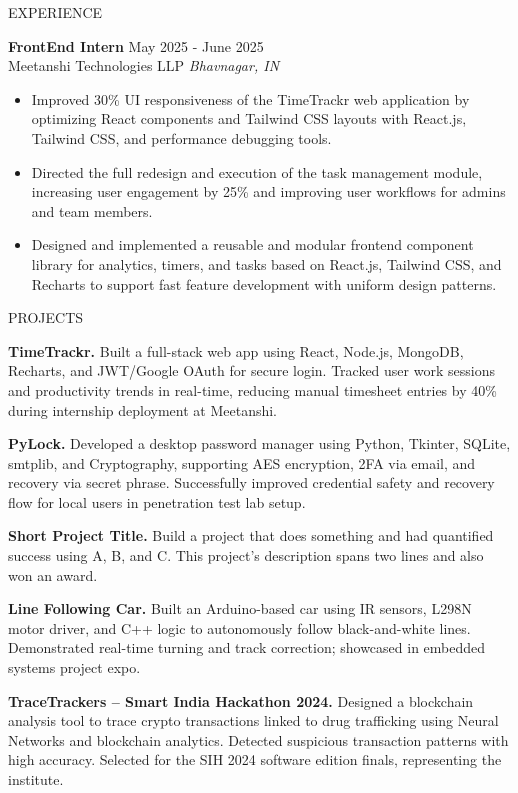 \documentclass{resume} %
\begin{document}
\begin{rSection}{EXPERIENCE}

\textbf{FrontEnd Intern} \hfill May 2025 - June 2025\\
Meetanshi Technologies LLP \hfill \textit{Bhavnagar, IN}
 \begin{itemize}
    \itemsep -3pt {} 
     \item Improved 30\% UI responsiveness of the TimeTrackr web application by optimizing React components and Tailwind CSS layouts with React.js, Tailwind CSS, and performance debugging tools.
     \item Directed the full redesign and execution of the task management module, increasing user engagement by 25\% and improving user workflows for admins and team members.
    \item Designed and implemented a reusable and modular frontend component library for analytics, timers, and tasks based on React.js, Tailwind CSS, and Recharts to support fast feature development with uniform design patterns. 
 \end{itemize}

\end{rSection} 


\begin{rSection}{PROJECTS}
\vspace{-1.25em}
\item \textbf{TimeTrackr.} {Built a full-stack web app using React, Node.js, MongoDB, Recharts, and JWT/Google OAuth for secure login. Tracked user work sessions and productivity trends in real-time, reducing manual timesheet entries by 40\% during internship deployment at Meetanshi.}
\item \textbf{PyLock.} {Developed a desktop password manager using Python, Tkinter, SQLite, smtplib, and Cryptography, supporting AES encryption, 2FA via email, and recovery via secret phrase. Successfully improved credential safety and recovery flow for local users in penetration test lab setup.}
\item \textbf{Short Project Title.} {Build a project that does something and had quantified success using A, B, and C. This project's description spans two lines and also won an award.}
\item \textbf{Line Following Car.} {Built an Arduino-based car using IR sensors, L298N motor driver, and C++ logic to autonomously follow black-and-white lines. Demonstrated real-time turning and track correction; showcased in embedded systems project expo.}
\item \textbf{TraceTrackers – Smart India Hackathon 2024.} {Designed a blockchain analysis tool to trace crypto transactions linked to drug trafficking using Neural Networks and blockchain analytics. Detected suspicious transaction patterns with high accuracy. Selected for the SIH 2024 software edition finals, representing the institute.}
\end{rSection} 
\end{document}
